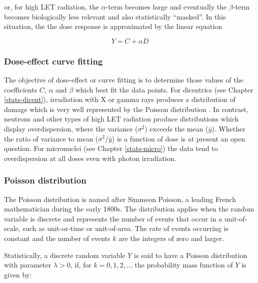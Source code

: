 \documentclass[]{scrartcl}
\begin{document}
or, for high LET radiation, the \(\alpha\)-term becomes large and eventually the \(\beta\)-term becomes biologically less relevant and also statistically ``masked''. In this situation, the the dose response is
approximated by the linear equation

\begin{equation} 
  Y = C + \alpha D
  \label{eq:dose-response-l}
\end{equation}

\hypertarget{dose-effect-curve-fitting}{%
\subsubsection{Dose-effect curve fitting}\label{dose-effect-curve-fitting}}

The objective of dose-effect or curve fitting is to determine those values of the coefficients \(C\), \(\alpha\) and \(\beta\) which best fit the data points. For dicentrics (see Chapter \ref{stats-dicent}), irradiation with X or gamma rays produces a distribution of damage which is very well represented by the Poisson distribution \citep{Edwards1979}. In contrast, neutrons and other types of high LET radiation produce distributions which display overdispersion, where the variance (\(\sigma^{2}\)) exceeds the mean (\(\bar{y}\)). Whether the ratio of variance to mean (\(\sigma^{2}/\bar{y}\)) is a function of dose is at present an open question. For micronuclei (see Chapter \ref{stats-micro}) the data tend to overdispersion at all doses even with photon irradiation.

\hypertarget{poisson-distribution}{%
\subsubsection{Poisson distribution}\label{poisson-distribution}}

The Poisson distribution is named after Simmeon Poisson, a leading French mathematician during the early 1800s. The distribution applies when the random variable is discrete and represents the number of events that occur in a unit-of-scale, such as unit-or-time or unit-of-area. The rate of events occurring is constant and the number of events \(k\) are the integers of zero and larger.

Statistically, a discrete random variable \(Y\) is said to have a Poisson distribution with parameter \(\lambda > 0\), if, for \(k = 0, 1, 2, \dots\) the probability mass function of \(Y\) is given by:
\end{document}
